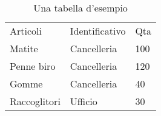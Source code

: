 \begin{table}[h!]
  \centering
    \begin{tabular}{lll}
      Articoli      & Identificativo & Qta \\
      Matite        & Cancelleria    & 100 \\
      Penne biro    & Cancelleria    & 120 \\
      Gomme         & Cancelleria    & 40  \\
      Raccoglitori  & Ufficio        & 30  \\
    \end{tabular}
  \caption{Una tabella d'esempio}
\end{table}
